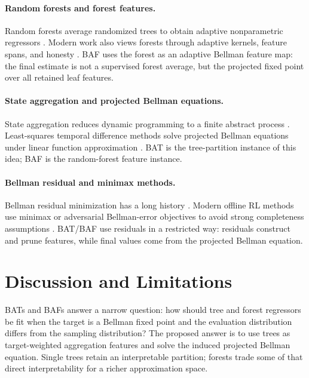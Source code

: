 \documentclass{article}
\theoremstyle{plain}
\theoremstyle{definition}
\theoremstyle{remark}
\begin{document}
\paragraph{Random forests and forest features.}
Random forests average randomized trees to obtain adaptive nonparametric
regressors \citep{breiman2001random}. Modern work also views forests through
adaptive kernels, feature spans, and honesty
\citep{wager2018estimation,athey2019generalized,scornet2016random}. BAF uses
the forest as an adaptive Bellman feature map: the final estimate is not a
supervised forest average, but the projected fixed point over all retained leaf
features.

\paragraph{State aggregation and projected Bellman equations.}
State aggregation reduces dynamic programming to a finite abstract process
\citep{van2006performance,bertsekas2011approximate}. Least-squares temporal
difference methods solve projected Bellman equations under linear function
approximation \citep{tsitsiklis1996analysis,lagoudakis2003least}. BAT is the
tree-partition instance of this idea; BAF is the random-forest feature instance.

\paragraph{Bellman residual and minimax methods.}
Bellman residual minimization has a long history \citep{baird1995residual}.
Modern offline RL methods use minimax or adversarial Bellman-error objectives
to avoid strong completeness assumptions
\citep{xie2020q,uehara2021finite,xie2021bellman}. BAT/BAF use residuals in a
restricted way: residuals construct and prune features, while final values come
from the projected Bellman equation.

\section{Discussion and Limitations}
\label{sec:discussion}

BATs and BAFs answer a narrow question: how should tree and forest regressors
be fit when the target is a Bellman fixed point and the evaluation distribution
differs from the sampling distribution? The proposed answer is to use trees as
target-weighted aggregation features and solve the induced projected Bellman
equation. Single trees retain an interpretable partition; forests trade some
of that direct interpretability for a richer approximation space.
\end{document}
